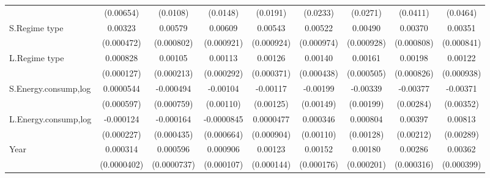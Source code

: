 \begin{table}[htbp]
\begin{tabular}{l*{8}{c}}
                    &   (0.00654)         &    (0.0108)         &    (0.0148)         &    (0.0191)         &    (0.0233)         &    (0.0271)         &    (0.0411)         &    (0.0464)         \\
[1em]
S.Regime type       &     0.00323\sym{***}&     0.00579\sym{***}&     0.00609\sym{***}&     0.00543\sym{***}&     0.00522\sym{***}&     0.00490\sym{***}&     0.00370\sym{***}&     0.00351\sym{***}\\
                    &  (0.000472)         &  (0.000802)         &  (0.000921)         &  (0.000924)         &  (0.000974)         &  (0.000928)         &  (0.000808)         &  (0.000841)         \\
[1em]
L.Regime type       &    0.000828\sym{***}&     0.00105\sym{***}&     0.00113\sym{***}&     0.00126\sym{***}&     0.00140\sym{***}&     0.00161\sym{***}&     0.00198\sym{**} &     0.00122         \\
                    &  (0.000127)         &  (0.000213)         &  (0.000292)         &  (0.000371)         &  (0.000438)         &  (0.000505)         &  (0.000826)         &  (0.000938)         \\
[1em]
S.Energy.consump,log&   0.0000544         &   -0.000494         &    -0.00104         &    -0.00117         &    -0.00199         &    -0.00339\sym{*}  &    -0.00377         &    -0.00371         \\
                    &  (0.000597)         &  (0.000759)         &   (0.00110)         &   (0.00125)         &   (0.00149)         &   (0.00199)         &   (0.00284)         &   (0.00352)         \\
[1em]
L.Energy.consump,log&   -0.000124         &   -0.000164         &  -0.0000845         &   0.0000477         &    0.000346         &    0.000804         &     0.00397\sym{*}  &     0.00813\sym{***}\\
                    &  (0.000227)         &  (0.000435)         &  (0.000664)         &  (0.000904)         &   (0.00110)         &   (0.00128)         &   (0.00212)         &   (0.00289)         \\
[1em]
Year                &    0.000314\sym{***}&    0.000596\sym{***}&    0.000906\sym{***}&     0.00123\sym{***}&     0.00152\sym{***}&     0.00180\sym{***}&     0.00286\sym{***}&     0.00362\sym{***}\\
                    & (0.0000402)         & (0.0000737)         &  (0.000107)         &  (0.000144)         &  (0.000176)         &  (0.000201)         &  (0.000316)         &  (0.000399)         \\

\end{tabular}
\end{table}
